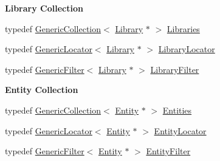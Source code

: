\begin{Indent}\textbf{ Library Collection}\par
\begin{DoxyCompactItemize}
\item 
typedef \mbox{\hyperlink{classHurricane_1_1GenericCollection}{Generic\+Collection}}$<$ \mbox{\hyperlink{classHurricane_1_1Library}{Library}} $\ast$ $>$ \mbox{\hyperlink{namespaceHurricane_a2868a53bbb0507710460ff02fab77cad}{Libraries}}
\item 
typedef \mbox{\hyperlink{classHurricane_1_1GenericLocator}{Generic\+Locator}}$<$ \mbox{\hyperlink{classHurricane_1_1Library}{Library}} $\ast$ $>$ \mbox{\hyperlink{namespaceHurricane_a0477ab8ee799bb25ce9521ac16dbb6b9}{Library\+Locator}}
\item 
typedef \mbox{\hyperlink{classHurricane_1_1GenericFilter}{Generic\+Filter}}$<$ \mbox{\hyperlink{classHurricane_1_1Library}{Library}} $\ast$ $>$ \mbox{\hyperlink{namespaceHurricane_a72d63f6bfd54feac2663e60430fd443d}{Library\+Filter}}
\end{DoxyCompactItemize}
\end{Indent}
\begin{Indent}\textbf{ Entity Collection}\par
\begin{DoxyCompactItemize}
\item 
typedef \mbox{\hyperlink{classHurricane_1_1GenericCollection}{Generic\+Collection}}$<$ \mbox{\hyperlink{classHurricane_1_1Entity}{Entity}} $\ast$ $>$ \mbox{\hyperlink{namespaceHurricane_af50ef2888fd2a5b58b0de14cdfaabc56}{Entities}}
\item 
typedef \mbox{\hyperlink{classHurricane_1_1GenericLocator}{Generic\+Locator}}$<$ \mbox{\hyperlink{classHurricane_1_1Entity}{Entity}} $\ast$ $>$ \mbox{\hyperlink{namespaceHurricane_ad3f039057bc40adfd993d83ace24fb83}{Entity\+Locator}}
\item 
typedef \mbox{\hyperlink{classHurricane_1_1GenericFilter}{Generic\+Filter}}$<$ \mbox{\hyperlink{classHurricane_1_1Entity}{Entity}} $\ast$ $>$ \mbox{\hyperlink{namespaceHurricane_af0fe741a1ef28dedcb26bf979b1dea5c}{Entity\+Filter}}
\end{DoxyCompactItemize}
\end{Indent}
